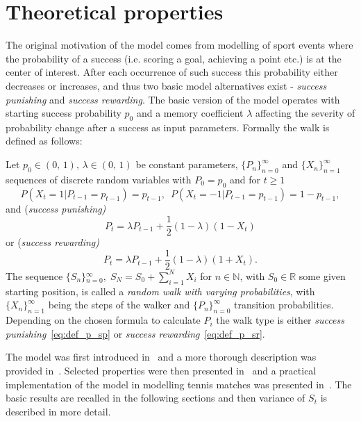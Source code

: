 \documentclass[runningheads]{CMSIM}
\begin{document}
    \section{Theoretical properties}\label{sec:theoretical-properties}

    The original motivation of the model comes from modelling of sport
    events where the probability of a success (i.e. scoring a goal, achieving
    a point etc.) is at the center of interest.
    After each occurrence
    of such success this probability either decreases or increases, and
    thus two basic model alternatives exist - \emph{success punishing} and \emph{success rewarding}.
    The basic version of the model operates
    with starting success probability $p_{0}$ and a memory coefficient
    $\lambda$ affecting the severity of probability change after a success
    as input parameters.
    Formally the walk is defined as follows:
    \begin{definition}
        \label{def:walk_definition}Let $\ensuremath{p_{0}\in(0,\,1),\,\lambda\in(0,\,1)}$
        be constant parameters, ${\{P_{n}\}}_{n=0}^{\infty}$ and ${\{X_{n}\}}_{n=1}^{\infty}$
        sequences of discrete random variables with $P_{0}=p_{0}$ and for
        $t\ge1$
        \[
            P(X_{t}=1|P_{t-1}=p_{t-1})=p_{t-1},\,\,\,P(X_{t}=-1|P_{t-1}=p_{t-1})=1-p_{t-1},
        \]
        and (\emph{success punishing)}
        \begin{equation}
            P_{t}=\lambda P_{t-1}+\frac{1}{2}(1-\lambda)(1-X_{t})\label{eq:def_p_sp}
        \end{equation}
        or (\emph{success rewarding)
            \begin{equation}
                P_{t}=\lambda P_{t-1}+\frac{1}{2}(1-\lambda)(1+X_{t}).\label{eq:def_p_sr}
            \end{equation}
        }The sequence ${\{S_{n}\}}{}_{n=0}^{\infty},\;S_{N}=S_{0}+\sum_{i=1}^{N}X_{i}$
        for $n\in\mathbb{N}$, with $S_{0}\in\mathbb{R}$ some given starting
        position, is called a \emph{random walk with varying probabilities},
        with ${\{X_{n}\}}_{n=1}^{\infty}$ being the steps of the walker and
        ${\{P_{n}\}}_{n=0}^{\infty}$ transition probabilities.
        Depending
        on the chosen formula to calculate $P_{i}$ the walk type is either
        \emph{success punishing}~\eqref{eq:def_p_sp} or \emph{success rewarding}~\eqref{eq:def_p_sr}.
    \end{definition}

    The model was first introduced in~\cite{ja2017ddny} and a more thorough
    description was provided in~\cite{ja2019teze}.
    Selected properties
    were then presented in~\cite{ja2019apmat} and a practical implementation
    of the model in modelling tennis matches was presented in~\cite{ja2019mathsport_proc}.
    The basic results are recalled in the following sections and then
    variance of $S_{t}$ is described in more detail.
\end{document}

